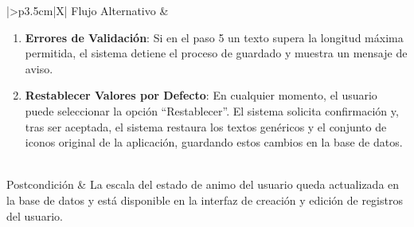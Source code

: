 \begin{xltabular}{\textwidth}{|>{\bfseries}p{3.5cm}|X|}
    Flujo Alternativo & 
    \begin{enumerate}[leftmargin=0.5cm, topsep=0pt, partopsep=0pt, parsep=0pt, itemsep=4pt]
        \item \textbf{Errores de Validación}: Si en el paso 5 un texto supera la longitud máxima permitida, el sistema detiene el proceso de guardado y muestra un mensaje de aviso.
        \item \textbf{Restablecer Valores por Defecto}: En cualquier momento, el usuario puede seleccionar la opción ``Restablecer''. El sistema solicita confirmación y, tras ser aceptada, el sistema restaura los textos genéricos y el conjunto de iconos original de la aplicación, guardando estos cambios en la base de datos.
    \end{enumerate}
    \\ \hline
    Postcondición & La escala del estado de animo del usuario queda actualizada en la base de datos y está disponible en la interfaz de creación y edición de registros del usuario. \\ \hline

    \caption{CU14: Personalizar Escala}
    \label{tab:esp_cu14} \\
\end{xltabular}
\endgroup

